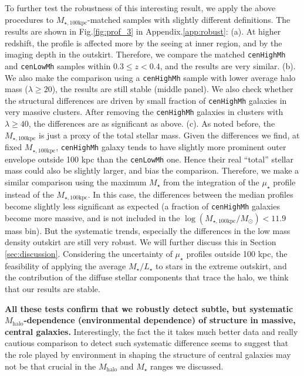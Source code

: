 \documentclass{emulateapj}
\def\rbcg{\texttt{cenHighMh}}
\def\nbcg{\texttt{cenLowMh}}
\def\mstar{{$M_{\star}$}}
\def\mhalo{{$M_{\mathrm{halo}}$}}
\def\mtot{{$M_{\star,100\mathrm{kpc}}$}}
\def\logmtot{{$\log (M_{\star,100\mathrm{kpc}}/M_{\odot})$}}
\def\m2l{{$M_{\star}/L_{\star}$}}
\def\mden{{$\mu_{\star}$}}
\newcommand{\update}[1]{\textcolor{Bittersweet}{#1}}
\begin{document}
\begin{CJK*}{UTF8}{gbsn}
    To further test the robustness of this interesting result, we apply the above 
    procedures to \mtot{}-matched samples with slightly different definitions.  
    The results are shown in Fig.\ref{fig:prof_3} in Appendix.\ref{app:robust}: 
    (a). At higher redshift, the profile is affected more by the seeing at inner 
    region, and by the imaging depth in the outskirt.  
    Therefore, we compare the matched \rbcg{} and \nbcg{} samples within 
    $0.3 \leq z < 0.4$, and the results are very similar.
    (b). We also make the comparison using a \rbcg{} sample with lower average 
    halo mass ($\lambda \geq 20$), the results are still stable (middle panel). 
    We also check whether the structural differences are driven by small fraction 
    of \rbcg{} galaxies in very massive clusters.  
    After removing the \rbcg{} galaxies in clusters with $\lambda \geq 40$, the 
    differences are as significant as above.  
    (c). As noted before, the \mtot{} is just a proxy of the total stellar mass. 
    Given the differences we find, at fixed \mtot{}, \rbcg{} galaxy tends to have 
    slightly more prominent outer envelope outside 100 kpc than the \nbcg{} one. 
    Hence their real ``total'' stellar mass could also be slightly larger, and 
    bias the comparison.  
    Therefore, we make a similar comparison using the maximum \mstar{} from 
    the integration of the \mden{} profile instead of the \mtot{}.
    \update{
    In this case, the differences between the median profiles become slightly 
    less significant as expected (a fraction of \rbcg{} galaxies become more 
    massive, and is not included in the \logmtot{}$< 11.9$ mass bin). 
    But the systematic trends, especially the differences in the low mass density 
    outskirt are still very robust. 
    We will further discuss this in Section \ref{sec:discussion}. 
    Considering the uncertainty of \mden{} profiles outside 100 kpc, the 
    feasibility of applying the average \m2l{} to stars in the extreme outskirt, 
    and the contribution of the diffuse stellar components that trace the halo, 
    we think that our results are stable.}
    
    \textbf{All these tests confirm that we robustly detect subtle, but systematic 
    \mhalo{}-dependence (environmental dependence) of structure in massive, 
    central galaxies.}
    \update{
    Interestingly, the fact the it takes much better data and really cautious 
    comparison to detect such systematic difference seems to suggest that the role 
    played by environment in shaping the structure of central galaxies may not be 
    that crucial in the \mhalo{} and \mstar{} ranges we discussed.}
    

\end{CJK*}
\end{document}

